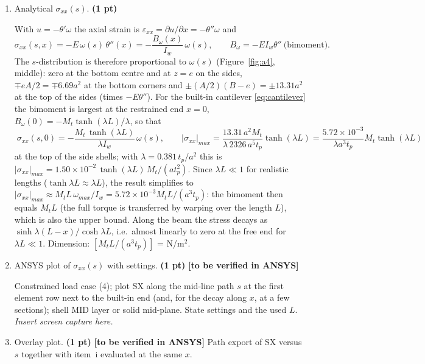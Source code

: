 \begin{enumerate}[label=\roman*.]
  \item Analytical $\sigma_{xx}(s)$. \textbf{(1 pt)}

  With $u=-\theta'\omega$ the axial strain is $\varepsilon_{xx}=\partial u/\partial x=-\theta''\omega$ and
  \begin{equation}
    \sigma_{xx}(s,x)=-E\,\omega(s)\,\theta''(x)=-\frac{B_\omega(x)}{I_w}\,\omega(s),\qquad B_\omega=-EI_w\theta''\ \text{(bimoment)}.
  \end{equation}
  The $s$-distribution is therefore proportional to $\omega(s)$ (Figure~\ref{fig:a4}, middle): zero at the bottom centre and at $z=e$ on the sides, $\mp e A/2=\mp6.69a^2$ at the bottom corners and $\pm(A/2)(B-e)=\pm13.31a^2$ at the top of the sides (times $-E\theta''$). For the built-in cantilever \eqref{eq:cantilever} the bimoment is largest at the restrained end $x=0$, $B_\omega(0)=-M_t\tanh(\lambda L)/\lambda$, so that
  \begin{equation}
    \boxed{\;\sigma_{xx}(s,0)=-\frac{M_t\,\tanh(\lambda L)}{\lambda I_w}\,\omega(s),\qquad
    |\sigma_{xx}|_{max}=\frac{13.31\,a^2M_t}{\lambda\,2326\,a^5t_p}\tanh(\lambda L)=\frac{5.72\times10^{-3}}{\lambda a^3t_p}M_t\tanh(\lambda L)\;}
  \end{equation}
  at the top of the side shells; with $\lambda=0.381\,t_p/a^2$ this is $|\sigma_{xx}|_{max}=1.50\times10^{-2}\,\tanh(\lambda L)\,M_t/(at_p^2)$. Since $\lambda L\ll1$ for realistic lengths ($\tanh\lambda L\approx\lambda L$), the result simplifies to $|\sigma_{xx}|_{max}\approx M_tL\,\omega_{max}/I_w=5.72\times10^{-3}M_tL/(a^3t_p)$: the bimoment then equals $M_tL$ (the full torque is transferred by warping over the length $L$), which is also the upper bound. Along the beam the stress decays as $\sinh\lambda(L-x)/\cosh\lambda L$, i.e.\ almost linearly to zero at the free end for $\lambda L\ll1$. Dimension: $[M_tL/(a^3t_p)]$ = N/m$^2$.

  \item ANSYS plot of $\sigma_{xx}(s)$ with settings. \textbf{(1 pt)} \textbf{[to be verified in ANSYS]}

  Constrained load case (4); plot SX along the mid-line path $s$ at the first element row next to the built-in end (and, for the decay along $x$, at a few sections); shell MID layer or solid mid-plane. State settings and the used $L$. \emph{Insert screen capture here.}

  \item Overlay plot. \textbf{(1 pt)} \textbf{[to be verified in ANSYS]} Path export of SX versus $s$ together with item~i evaluated at the same $x$.


\end{enumerate}
